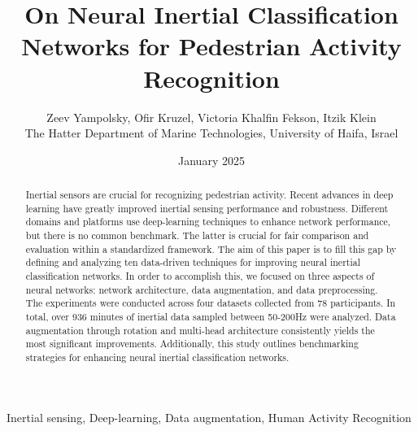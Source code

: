 \documentclass[journal]{IEEEtran}
\title{On Neural Inertial Classification Networks for Pedestrian Activity Recognition }
\author{
    Zeev Yampolsky, Ofir Kruzel, Victoria Khalfin Fekson, Itzik Klein
    
    The Hatter Department of Marine Technologies, University of Haifa, Israel
}
\date{January 2025}
\begin{document}
\maketitle

\begin{abstract}
Inertial sensors are crucial for recognizing pedestrian activity. Recent advances in deep learning have greatly improved inertial sensing performance and robustness. Different domains and platforms use deep-learning techniques to enhance network performance, but there is no common benchmark. The latter is crucial for fair comparison and evaluation within a standardized framework. The aim of this paper is to fill this gap by defining and analyzing ten data-driven techniques for improving neural inertial classification networks. In order to accomplish this, we focused on three aspects of neural networks: network architecture, data augmentation, and data preprocessing. The experiments were conducted across four datasets collected from 78 participants. In total, over 936 minutes of inertial data sampled between 50-200Hz were analyzed. Data augmentation through rotation and multi-head architecture consistently yields the most significant improvements. Additionally, this study outlines benchmarking strategies for enhancing neural inertial classification networks.
\end{abstract}

\begin{IEEEkeywords}
Inertial sensing, Deep-learning, Data augmentation, Human Activity Recognition 
\end{IEEEkeywords}
\IEEEpeerreviewmaketitle
\end{document}
